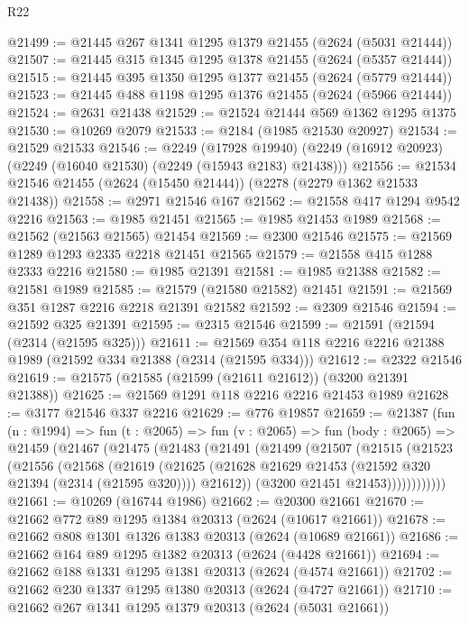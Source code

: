 \begin{lexlean}{R22}
\begin{coremodule}
@21499 := @21445 @267 @1341 @1295 @1379 @21455 (@2624 (@5031 @21444))
@21507 := @21445 @315 @1345 @1295 @1378 @21455 (@2624 (@5357 @21444))
@21515 := @21445 @395 @1350 @1295 @1377 @21455 (@2624 (@5779 @21444))
@21523 := @21445 @488 @1198 @1295 @1376 @21455 (@2624 (@5966 @21444))
@21524 := @2631 @21438
@21529 := @21524 @21444 @569 @1362 @1295 @1375
@21530 := @10269 @2079
@21533 := @2184 (@1985 @21530 @20927)
@21534 := @21529 @21533
@21546 := @2249
    (@17928 @19940)
    (@2249 (@16912 @20923) (@2249 (@16040 @21530) (@2249 (@15943 @2183) @21438)))
@21556 := @21534 @21546 @21455 (@2624 (@15450 @21444)) (@2278 (@2279 @1362 @21533 @21438))
@21558 := @2971 @21546 @167
@21562 := @21558 @417 @1294 @9542 @2216
@21563 := @1985 @21451
@21565 := @1985 @21453 @1989
@21568 := @21562 (@21563 @21565) @21454
@21569 := @2300 @21546
@21575 := @21569 @1289 @1293 @2335 @2218 @21451 @21565
@21579 := @21558 @415 @1288 @2333 @2216
@21580 := @1985 @21391
@21581 := @1985 @21388
@21582 := @21581 @1989
@21585 := @21579 (@21580 @21582) @21451
@21591 := @21569 @351 @1287 @2216 @2218 @21391 @21582
@21592 := @2309 @21546
@21594 := @21592 @325 @21391
@21595 := @2315 @21546
@21599 := @21591 (@21594 (@2314 (@21595 @325)))
@21611 := @21569 @354 @118 @2216 @2216 @21388 @1989 (@21592 @334 @21388 (@2314 (@21595 @334)))
@21612 := @2322 @21546
@21619 := @21575 (@21585 (@21599 (@21611 @21612)) (@3200 @21391 @21388))
@21625 := @21569 @1291 @118 @2216 @2216 @21453 @1989
@21628 := @3177 @21546 @337 @2216
@21629 := @776 @19857
@21659 := @21387
    (fun (n : @1994) =>
    fun (t : @2065) =>
    fun (v : @2065) =>
    fun (body : @2065) =>
    @21459
      (@21467
        (@21475
          (@21483
            (@21491
              (@21499
                (@21507
                  (@21515
                    (@21523
                      (@21556
                        (@21568
                          (@21619
                            (@21625
                              (@21628 @21629 @21453 (@21592 @320 @21394 (@2314 (@21595 @320))))
                              @21612))
                          (@3200 @21451 @21453))))))))))))
@21661 := @10269 (@16744 @1986)
@21662 := @20300 @21661
@21670 := @21662 @772 @89 @1295 @1384 @20313 (@2624 (@10617 @21661))
@21678 := @21662 @808 @1301 @1326 @1383 @20313 (@2624 (@10689 @21661))
@21686 := @21662 @164 @89 @1295 @1382 @20313 (@2624 (@4428 @21661))
@21694 := @21662 @188 @1331 @1295 @1381 @20313 (@2624 (@4574 @21661))
@21702 := @21662 @230 @1337 @1295 @1380 @20313 (@2624 (@4727 @21661))
@21710 := @21662 @267 @1341 @1295 @1379 @20313 (@2624 (@5031 @21661))

\end{coremodule}
\end{lexlean}
